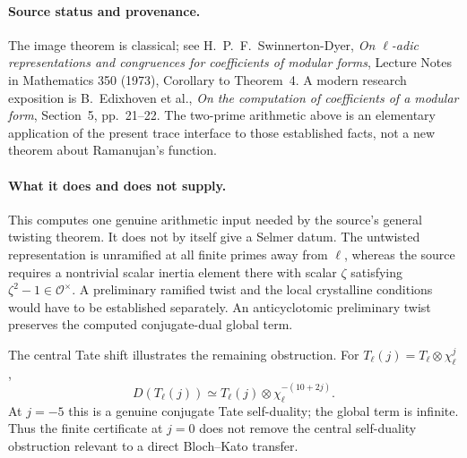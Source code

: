 \paragraph{Source status and provenance.}
The image theorem is classical; see H.~P.~F.~Swinnerton-Dyer,
\emph{On $\ell$-adic representations and congruences for coefficients
of modular forms}, Lecture Notes in Mathematics 350 (1973),
Corollary to Theorem~4.  A modern research exposition is B.~Edixhoven
et al., \emph{On the computation of coefficients of a modular form},
Section~5, pp.~21--22.  The two-prime arithmetic above is an elementary
application of the present trace interface to those established facts,
not a new theorem about Ramanujan's function.

\paragraph{What it does and does not supply.}
This computes one genuine arithmetic input needed by the source's
general twisting theorem.\cite{selmergeneral}  It does not by itself give a Selmer datum.
The untwisted representation is unramified at all finite primes away
from $\ell$, whereas the source requires a nontrivial scalar inertia
element there with scalar $\zeta$ satisfying $\zeta^2-1\in\mathcal
O^\times$.  A preliminary ramified twist and the local crystalline
conditions would have to be established separately.  An anticyclotomic
preliminary twist preserves the computed conjugate-dual global term.

The central Tate shift illustrates the remaining obstruction.  For
$T_\ell(j)=T_\ell\otimes\chi_\ell^j$,
\[
 D(T_\ell(j))\simeq
       T_\ell(j)\otimes\chi_\ell^{-(10+2j)}.
\]
At $j=-5$ this is a genuine conjugate Tate self-duality; the global
term is infinite.  Thus the finite certificate at $j=0$ does not
remove the central self-duality obstruction relevant to a direct
Bloch--Kato transfer.
